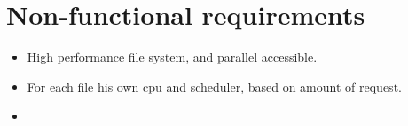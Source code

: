 {
\setcounter{funcNFR}{10}
\renewcommand{\labelitemi}{
	\ifnum \value{funcNFR}<10$/NF 0\arabic{funcNFR} /$\addtocounter{funcNFR}{10}
	\else $/NF \arabic{funcNFR} /$\addtocounter{funcNFR}{10}\fi
}

\section{Non-functional requirements}
	\begin{itemize}
		\item High performance file system, and parallel accessible.
		\item For each file his own cpu and scheduler, based on amount of request.
		\item 
	\end{itemize}
}